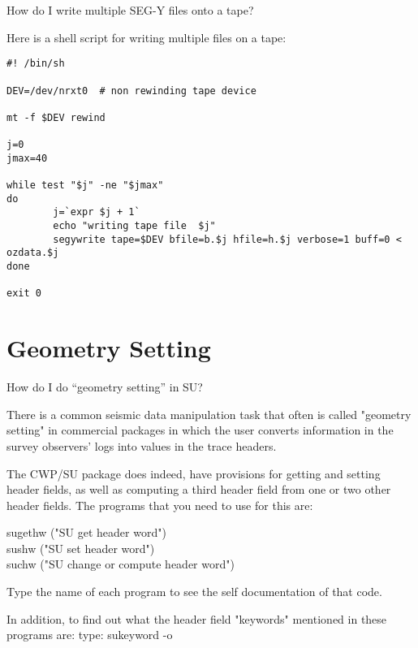 {{{{{{{\begin{question}
How do I write multiple SEG-Y files onto a tape?
\end{question}


\begin{rmans}
Here is a shell script for writing multiple files on a tape:
{\small \begin{verbatim}
#! /bin/sh

DEV=/dev/nrxt0  # non rewinding tape device

mt -f $DEV rewind

j=0
jmax=40

while test "$j" -ne "$jmax"
do
        j=`expr $j + 1`
        echo "writing tape file  $j"
        segywrite tape=$DEV bfile=b.$j hfile=h.$j verbose=1 buff=0 < ozdata.$j
done

exit 0
\end{verbatim}}\noindent
\end{rmans}

\section{Geometry Setting}
\begin{question}
How do I do ``geometry setting'' in SU?
\end{question}
\begin{rmans}

There is a common seismic data manipulation task that often is 
called "geometry setting" in commercial packages in which the
user converts information in the survey observers' logs
into values in the trace headers.

\noindent The CWP/SU package does indeed, have provisions for getting and
setting header fields, as well as computing a third header field
from one or two other header fields. The programs that you need
to use for this are:


\vspace{1ex}
\indent sugethw    ("SU get header word") \\
\indent sushw      ("SU set header word") \\
\indent suchw      ("SU change or compute header word")
\vspace{1ex}

\noindent Type the name of each program to see the self
documentation of that code.

\vspace{1ex}
\noindent In addition, to find out what the header field "keywords"
mentioned in these programs are:  type:    sukeyword -o


\end{rmans}}}}}}}}

